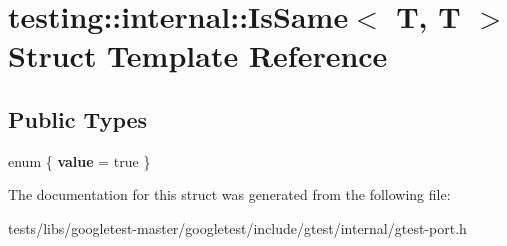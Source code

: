 \hypertarget{structtesting_1_1internal_1_1IsSame_3_01T_00_01T_01_4}{}\section{testing\+:\+:internal\+:\+:Is\+Same$<$ T, T $>$ Struct Template Reference}
\label{structtesting_1_1internal_1_1IsSame_3_01T_00_01T_01_4}
\subsection*{Public Types}
\begin{DoxyCompactItemize}
\item 
\mbox{\label{structtesting_1_1internal_1_1IsSame_3_01T_00_01T_01_4_ac0d986abcf98ce8eb16fbb9da6d1e6c4}} 
enum \{ {\bfseries value} = true
 \}
\end{DoxyCompactItemize}


The documentation for this struct was generated from the following file\+:\begin{DoxyCompactItemize}
\item 
tests/libs/googletest-\/master/googletest/include/gtest/internal/gtest-\/port.\+h\end{DoxyCompactItemize}
